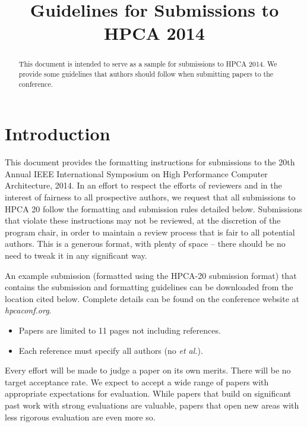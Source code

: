 \documentclass[pageno]{jpaper}
\begin{document}
\title{
Guidelines for Submissions to HPCA 2014}

\date{}
\maketitle

\thispagestyle{empty}

\begin{abstract}
This document is intended to serve as a sample for submissions to HPCA 2014.
We provide some guidelines that authors should follow when submitting papers to
the conference.
\end{abstract}

\section{Introduction}

This document provides the formatting instructions for submissions to the 20th
Annual IEEE International Symposium on High Performance Computer Architecture,
2014. In an effort to respect the efforts of reviewers and in
the interest of fairness to all prospective authors, we request that all
submissions to HPCA 20 follow the formatting and submission rules detailed
below.  Submissions that violate these instructions may not be
reviewed, at the discretion of the program chair, in order to maintain a review
process that is fair to all potential authors.  This is a generous format,
with plenty of space -- there should be no need to tweak it in any
significant way.

An example submission (formatted using the HPCA-20 submission format) that
contains the submission and formatting guidelines can be downloaded from
the location cited below.  Complete details can be found on the
conference website at {\em hpcaconf.org}.


\begin{itemize}
\item Papers are limited to 11 pages not including references.
\item Each reference must specify all authors (no {\it et al.}).
\end{itemize}


Every effort will be made to judge a paper on its own merits. There will be no target acceptance rate. We expect to accept a wide range of papers with appropriate expectations for evaluation. 
While papers that build on significant past work with strong evaluations are valuable, papers that open new areas with less rigorous evaluation are even more so.
\end{document}
